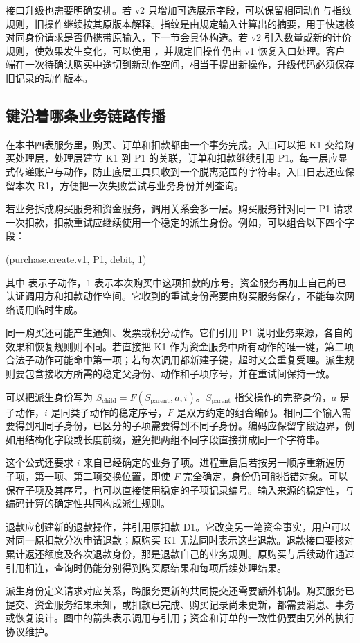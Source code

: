 接口升级也需要明确安排。若 v2 只增加可选展示字段，可以保留相同动作与指纹规则，旧操作继续按其原版本解释。指纹是由规定输入计算出的摘要，用于快速核对同身份请求是否仍携带原输入，下一节会具体构造。若 v2 引入数量或新的计价规则，使效果发生变化，可以使用 ，并规定旧操作仍由 v1 恢复入口处理。客户端在一次待确认购买中途切到新动作空间，相当于提出新操作，升级代码必须保存旧记录的动作版本。

\subsection*{键沿着哪条业务链路传播}

在本书四表服务里，购买、订单和扣款都由一个事务完成。入口可以把 K1 交给购买处理层，处理层建立 K1 到 P1 的关联，订单和扣款继续引用 P1。每一层应显式传递账户与动作，防止底层工具只收到一个脱离范围的字符串。入口日志还应保留本次 R1，方便把一次失败尝试与业务身份并列查询。

若业务拆成购买服务和资金服务，调用关系会多一层。购买服务针对同一 P1 请求一次扣款，扣款重试应继续使用一个稳定的派生身份。例如，可以组合以下四个字段：
\begin{BookCode}
(purchase.create.v1, P1, debit, 1)
\end{BookCode}
其中  表示子动作，1 表示本次购买中这项扣款的序号。资金服务再加上自己的已认证调用方和扣款动作空间。它收到的重试身份需要由购买服务保存，不能每次网络调用临时生成。



同一购买还可能产生通知、发票或积分动作。它们引用 P1 说明业务来源，各自的效果和恢复规则则不同。若直接把 K1 作为资金服务中所有动作的唯一键，第二项合法子动作可能命中第一项；若每次调用都新建子键，超时又会重复受理。派生规则要包含接收方所需的稳定父身份、动作和子项序号，并在重试间保持一致。

可以把派生身份写为 \(S_{\mathrm{child}}=F(S_{\mathrm{parent}},a,i)\)。\(S_{\mathrm{parent}}\) 指父操作的完整身份，\(a\) 是子动作，\(i\) 是同类子动作的稳定序号，\(F\) 是双方约定的组合编码。相同三个输入需要得到相同子身份，已区分的子项需要得到不同子身份。编码应保留字段边界，例如用结构化字段或长度前缀，避免把两组不同字段直接拼成同一个字符串。

这个公式还要求 \(i\) 来自已经确定的业务子项。进程重启后若按另一顺序重新遍历子项，第一项、第二项交换位置，即使 \(F\) 完全确定，身份仍可能指错对象。可以保存子项及其序号，也可以直接使用稳定的子项记录编号。输入来源的稳定性，与编码计算的确定性共同构成派生规则。

退款应创建新的退款操作，并引用原扣款 D1。它改变另一笔资金事实，用户可以对同一原扣款分次申请退款；原购买 K1 无法同时表示这些退款。退款接口要核对累计返还额度及各次退款身份，那是退款自己的业务规则。原购买与后续动作通过引用相连，查询时仍能分别得到购买原结果和每项后续处理结果。

派生身份定义请求对应关系，跨服务更新的共同提交还需要额外机制。购买服务已提交、资金服务结果未知，或扣款已完成、购买记录尚未更新，都需要消息、事务或恢复设计。图中的箭头表示调用与引用；资金和订单的一致性仍要由另外的执行协议维护。
\FloatBarrier
